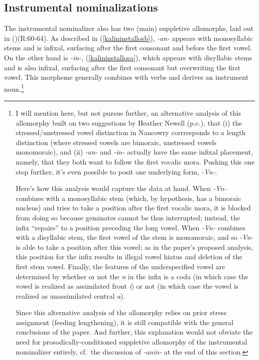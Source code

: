\documentclass[output=paper,colorlinks,citecolor=brown,
]{langscibook}
\newcounter{nexttmp}    %
\newcommand{\Next}{\setcounter{nexttmp}{\value{equation}}\stepcounter{nexttmp}(\thenexttmp)\xspace}
\begin{document}
\subsection{Instrumental nominalizations}

The instrumental nominalizer also has two (main) suppletive allomorphs, laid out in \Next (R:60-64). As described in (\ref{kalininstallosb}), \textit{-an-} appears with monosyllabic stems and is infixal, surfacing after the first consonant and before the first vowel. On the other hand is \textit{-in-}, (\ref{kalininstallosa}), which appears with disyllabic stems and is also infixal, surfacing after the first consonant but overwriting the first vowel. This morpheme generally combines with verbs and derives an instrument noun.\footnote{I will mention here, but not pursue further, an alternative analysis of this allomorphy built on two suggestions by Heather Newell (p.c.), that (i) the stressed/unstressed vowel distinction in Nancowry corrresponds to a length distinction (where stressed vowels are bimoraic, unstressed vowels monomoraic), and (ii) \textit{-an-} and \textit{-in-} actually have the same infixal placement, namely, that they both want to follow the first vocalic mora. Pushing this one step further, it's even possible to posit one underlying form, \textit{-Vn-}. 

Here's how this analysis would capture the data at hand. When \textit{-Vn-} combines with a monosyllabic stem (which, by hypothesis, has a bimoraic nucleus) and tries to take a position after the first vocalic mora, it is blocked from doing so because geminates cannot be thus interrupted; instead, the infix ``repairs'' to a position preceding the long vowel. When \textit{-Vn-} combines with a disyllabic stem, the first vowel of the stem is monomoraic, and so \textit{-Vn-} is able to take a position after this vowel; as in the paper's proposed analysis, this position for the infix results in illegal vowel hiatus and deletion of the first stem vowel. Finally, the features of the underspecified vowel are determined by whether or not the \textit{n} in the infix is a coda (in which case the vowel is realized as assimilated front \textit{i}) or not (in which case the vowel is realized as unassimilated central \textit{a}). 

Since this alternative analysis of the allomorphy relies on prior stress assignment (feeding lengthening), it is still compatible with the general conclusions of the paper. And further, this explanation would not obviate the need for prosodically-conditioned suppletive allomorphy of the instrumental nominalizer entirely, cf.\ the discussion of \textit{-anin-} at the end of this section.\label{kalinfnheather}} 
\end{document}
